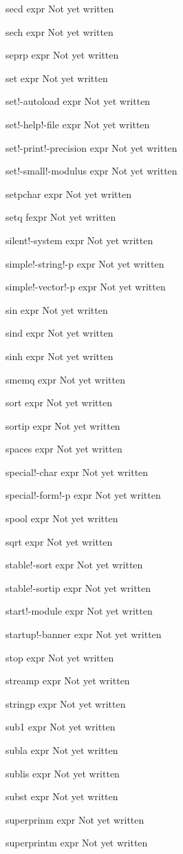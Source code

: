 \documentclass[a4paper,11pt]{article}
\begin{document}
\begin{description}
secd expr
Not yet written

sech expr
Not yet written

seprp expr
Not yet written

set expr
Not yet written

set!-autoload expr
Not yet written

set!-help!-file expr
Not yet written

set!-print!-precision expr
Not yet written

set!-small!-modulus expr
Not yet written

setpchar expr
Not yet written

setq fexpr
Not yet written

silent!-system expr
Not yet written

simple!-string!-p expr
Not yet written

simple!-vector!-p expr
Not yet written

sin expr
Not yet written

sind expr
Not yet written

sinh expr
Not yet written

smemq expr
Not yet written

sort expr
Not yet written

sortip expr
Not yet written

spaces expr
Not yet written

special!-char expr
Not yet written

special!-form!-p expr
Not yet written

spool expr
Not yet written

sqrt expr
Not yet written

stable!-sort expr
Not yet written

stable!-sortip expr
Not yet written

start!-module expr
Not yet written

startup!-banner expr
Not yet written

stop expr
Not yet written

streamp expr
Not yet written

stringp expr
Not yet written

sub1 expr
Not yet written

subla expr
Not yet written

sublis expr
Not yet written

subst expr
Not yet written

superprinm expr
Not yet written

superprintm expr
Not yet written


\end{description}
\end{document}
